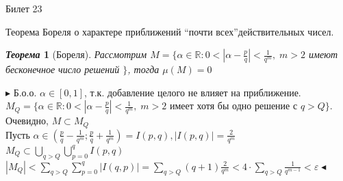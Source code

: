 \documentclass[a4paper,12pt]{article}
\newtheorem{teo}{\textit{Теорема}}
\newcommand{\AL}{\alpha}
\newcommand{\pb}{\blacktriangleright}
\newcommand{\pe}{\blacktriangleleft}
\newcommand{\bb}[1]{\mathbb{#1}}
\newcommand{\SL}{\sum\limits}
\begin{document}
\newpage
\begin{mybox}{\hypertarget{bil23}{Билет 23}}

\begin{formbox}{}
Теорема Бореля о характере приближений \textquotedblleft  почти всех\textquotedblright  действительных чисел.
\end{formbox}

\begin{formbox}{}
\begin{teo} [Бореля] Рассмотрим $M = \{\AL\in\bb{R}: 0 < \left|\AL - \frac{p}{q}\right| < \frac{1}{q^m},\; m>2$ имеют бесконечное число решений $\}$, тогда $\mu(M) = 0$
\end{teo}
\end{formbox}
$\pb$ Б.о.о. $\AL\in[0,1]$, т.к. добавление целого не влияет на приближение.\\
$M_Q = \{\AL\in\bb{R}: 0 < \left|\AL - \frac{p}{q}\right| < \frac{1}{q^m},\; m>2$ имеет хотя бы одно решение с $q > Q \}$. Очевидно, $M \subset M_Q$\\
Пусть $\AL \in \left( \frac{p}{q} - \frac{1}{q^m}; \frac{p}{q} + \frac{1}{q^m}  \right) = I(p,q), |I(p,q)| = \frac{2}{q^m} $\\
$M_Q\subset \bigcup\limits_{q>Q}\bigcup\limits_{p=0}^{q} I(p,q)$\\
$|M_Q| <\SL_{q > Q}\SL_{p=0}^{q} |I(q,p)| = \SL_{q > Q}(q+1)\frac{2}{q^m} < 4\cdot\SL_{q>Q}\frac{1}{q^{m-1}}< \varepsilon \pe $



\end{mybox}
\end{document}
